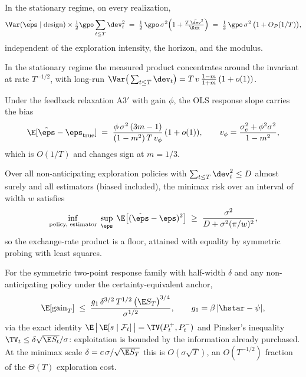 \documentclass[11pt]{article}
\begin{document}
\begin{theorem}
In the stationary regime, on every realization,
\[
\Var(\hat\eps \mid \mathrm{design}) \times \tfrac{1}{2}\gpo \sum_{t\le T}
\dev_t^2 \;=\; \tfrac{1}{2}\,\gpo\,\sigma^2\Big(1 +
\tfrac{T\,\bar{\dev}^2}{\Sxx}\Big)
\;=\; \tfrac{1}{2}\,\gpo\,\sigma^2\,\big(1 + O_P(1/T)\big),
\]
independent of the exploration intensity, the horizon, and the modulus.
\end{theorem}

\begin{proposition}[Concentration; P2.1]
In the stationary regime the measured product concentrates around the
invariant at rate $T^{-1/2}$, with long-run
$\Var\big(\sum_{t\le T}\dev_t\big) = T\,v\,\tfrac{1-m}{1+m}\,(1+o(1))$.
\end{proposition}

\begin{proposition}
Under the feedback relaxation A3$'$ with gain $\phi$, the OLS response
slope carries the bias
\[
\E[\hat\eps - \eps_{\mathrm{true}}] \;=\;
\frac{\phi\,\sigma^2\,(3m-1)}{(1-m^2)\,T\,v_\phi}\,(1+o(1)),
\qquad v_\phi = \frac{\sigma_e^2 + \phi^2\sigma^2}{1-m^2},
\]
which is $O(1/T)$ and changes sign at $m = 1/3$.
\end{proposition}

\begin{theorem}
Over all non-anticipating exploration policies with
$\sum_{t\le T} \dev_t^2 \le D$ almost surely and all estimators (biased
included), the minimax risk over an interval of width $w$ satisfies
\[
\inf_{\text{policy, estimator}}\;\sup_{\eps}\;
\E\big[(\hat\eps - \eps)^2\big] \;\ge\;
\frac{\sigma^2}{D + \sigma^2 (\pi/w)^2},
\]
so the exchange-rate product is a floor, attained with equality by
symmetric probing with least squares.
\end{theorem}

\begin{lemma}
For the symmetric two-point response family with half-width $\delta$ and
any non-anticipating policy under the certainty-equivalent anchor,
\[
\E[\mathrm{gain}_T] \;\le\;
\frac{g_1\,\delta^{3/2}\,T^{1/2}\,\big(\E S_T\big)^{3/4}}{\sigma^{1/2}},
\qquad g_1 = \beta\,|\hstar - \psi|,
\]
via the exact identity $\E\,\big|\,\E[s\mid\mathcal{F}_t]\,\big|
= \TV(P^+_t, P^-_t)$ and Pinsker's inequality
$\TV_t \le \delta\sqrt{\E S_t}/\sigma$: exploitation is bounded by the
information already purchased. At the minimax scale
$\delta = c\,\sigma/\sqrt{\E S_T}$ this is $O(\sigma\sqrt{T})$, an
$O(T^{-1/2})$ fraction of the $\Theta(T)$ exploration cost.
\end{lemma}
\end{document}
